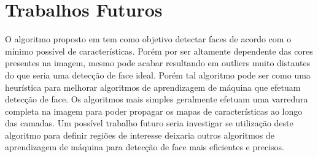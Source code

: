 \documentclass[journal,onecolumn]{IEEEtran}
\begin{document}
	\section{Trabalhos Futuros}
	\label{sec:trabalhosFuturos}
	O algoritmo proposto em \cite{chen2007simple} tem como objetivo detectar faces de acordo com o mínimo possível de características.
	Porém por ser altamente dependente das cores presentes na imagem, mesmo pode acabar resultando em outliers muito distantes do que seria uma detecção de face ideal.
	Porém tal algoritmo pode ser como uma heurística para melhorar algoritmos de aprendizagem de máquina que efetuam detecção de face.
	Os algoritmos mais simples geralmente efetuam uma varredura completa na imagem para poder propagar os mapas de características ao longo das camadas.
	Um possível trabalho futuro seria investigar se utilização deste algoritmo para definir regiões de interesse  deixaria outros algoritmos de aprendizagem de máquina para detecção de face mais eficientes e precisos.
	


\end{document}

